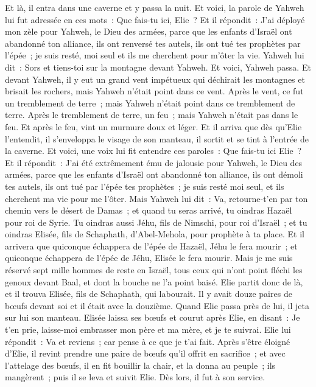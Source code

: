 \begin{multicols}{2}
Et là, il entra dans une caverne et y passa la nuit. Et voici, la parole de Yahweh lui fut adressée en ces mots~: Que fais-tu ici, Elie~?
Et il répondit~: J'ai déployé mon zèle pour Yahweh, le Dieu des armées, parce que les enfants d'Israël ont abandonné ton alliance, ils ont renversé tes autels, ils ont tué tes prophètes par l'épée~; je suis resté, moi seul et ils me cherchent pour m'ôter la vie.
Yahweh lui dit~: Sors et tiens-toi sur la montagne devant Yahweh. Et voici, Yahweh passa. Et devant Yahweh, il y eut un grand vent impétueux qui déchirait les montagnes et brisait les rochers, mais Yahweh n'était point dans ce vent. Après le vent, ce fut un tremblement de terre~; mais Yahweh n'était point dans ce tremblement de terre.
Après le tremblement de terre, un feu~; mais Yahweh n'était pas dans le feu. Et après le feu, vint un murmure doux et léger.
Et il arriva que dès qu'Elie l'entendit, il s'enveloppa le visage de son manteau, il sortit et se tint à l'entrée de la caverne. Et voici, une voix lui fit entendre ces paroles~: Que fais-tu ici Elie~?
Et il répondit~: J'ai été extrêmement ému de jalousie pour Yahweh, le Dieu des armées, parce que les enfants d'Israël ont abandonné ton alliance, ils ont démoli tes autels, ils ont tué par l'épée tes prophètes~; je suis resté moi seul, et ils cherchent ma vie pour me l'ôter.
Mais Yahweh lui dit~: Va, retourne-t'en par ton chemin vers le désert de Damas~; et quand tu seras arrivé, tu oindras Hazaël pour roi de Syrie.
Tu oindras aussi Jéhu, fils de Nimschi, pour roi d'Israël~; et tu oindras Elisée, fils de Schaphath, d'Abel-Mehola, pour prophète à ta place.
Et il arrivera que quiconque échappera de l'épée de Hazaël, Jéhu le fera mourir~; et quiconque échappera de l'épée de Jéhu, Elisée le fera mourir.
Mais je me suis réservé sept mille hommes de reste en Israël, tous ceux qui n'ont point fléchi les genoux devant Baal, et dont la bouche ne l'a point baisé.
Elie partit donc de là, et il trouva Elisée, fils de Schaphath, qui labourait. Il y avait douze paires de bœufs devant soi et il était avec la douzième. Quand Elie passa près de lui, il jeta sur lui son manteau.
Elisée laissa ses bœufs et courut après Elie, en disant~: Je t'en prie, laisse-moi embrasser mon père et ma mère, et je te suivrai. Elie lui répondit~: Va et reviens~; car pense à ce que je t'ai fait.
Après s'être éloigné d'Elie, il revint prendre une paire de bœufs qu'il offrit en sacrifice~; et avec l'attelage des bœufs, il en fit bouillir la chair, et la donna au peuple~; ils mangèrent~; puis il se leva et suivit Elie. Dès lors, il fut à son service.

\end{multicols}
